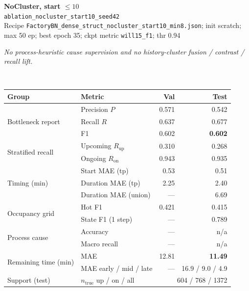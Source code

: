 \documentclass[9pt,a4paper,twocolumn]{extarticle}
\begin{document}
\noindent\begin{minipage}{\columnwidth}
\begin{center}
{\small\bfseries NoCluster, start $\le 10$}\\
{\scriptsize\texttt{ablation\_nocluster\_start10\_seed42}}\\
{\scriptsize Recipe \texttt{FactoryBN\_dense\_struct\_nocluster\_start10\_min8.json}; init scratch; max 50 ep; best epoch 35; ckpt metric \texttt{will15\_f1}; thr 0.94}\\[1pt]
\parbox{0.96\columnwidth}{\scriptsize\itshape No process-heuristic cause supervision and no history-cluster fusion / contrast / recall lift.}\\[2pt]
\scriptsize\setlength{\tabcolsep}{3pt}
\begin{tabular}{llrr}
\toprule
Group & Metric & Val & Test \\
\midrule
\multirow{3}{*}{Bottleneck report}
  & Precision $P$ & 0.571 & 0.542 \\
  & Recall $R$ & 0.637 & 0.677 \\
  & F1 & 0.602 & \textbf{0.602} \\
\midrule
\multirow{2}{*}{Stratified recall}
  & Upcoming $R_{\mathrm{up}}$ & 0.310 & 0.268 \\
  & Ongoing $R_{\mathrm{on}}$ & 0.943 & 0.935 \\
\midrule
\multirow{3}{*}{Timing (min)}
  & Start MAE (tp) & 0.53 & 0.51 \\
  & Duration MAE (tp) & 2.25 & 2.40 \\
  & Duration MAE (union) & --- & 6.69 \\
\midrule
\multirow{2}{*}{Occupancy grid}
  & Hot F1 & 0.421 & 0.415 \\
  & State F1 (1 step) & --- & 0.789 \\
\midrule
\multirow{2}{*}{Process cause}
  & Accuracy & --- & n/a \\
  & Macro recall & --- & n/a \\
\midrule
\multirow{2}{*}{Remaining time (min)}
  & MAE & 12.81 & \textbf{11.49} \\
  & MAE early / mid / late & --- & 16.9 / 9.0 / 4.9 \\
\midrule
Support (test)
  & $n_{\mathrm{true}}$ up / on / all & \multicolumn{2}{r}{604 / 768 / 1372} \\
\bottomrule
\end{tabular}
\end{center}
\end{minipage}\par\vspace{6pt}
\end{document}
